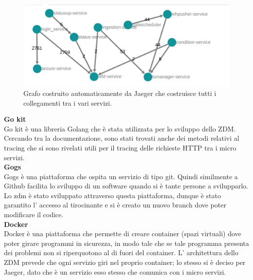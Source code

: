 \documentclass[a4paper,12pt,titlepage,italian,openany]{report}
\begin{document}
\begin{figure}[H]
    \includegraphics[scale=0.4]{grafo.jpg}
    \centering
    \caption{Grafo costruito automaticamente da Jaeger che costruisce tutti i collegamenti tra i vari servizi.}
\end{figure}

\textbf{Go kit}\\
Go kit\cite{go:2} è una libreria Golang che è stata utilizzata per lo sviluppo dello ZDM\cite{zdm:1}. Cercando tra la documentazione, sono stati trovati anche dei metodi relativi al tracing che si sono rivelati utili
per il tracing delle richieste HTTP tra i micro servizi. \\[12pt]

\textbf{Gogs}\\
Gogs\cite{gogs:1} è una piattaforma che ospita un servizio di tipo git. Quindi similmente a Github facilita lo sviluppo di un software quando si è tante persone a svilupparlo. Lo zdm è stato sviluppato attraverso questa piattaforma, dunque è stato garantito l' accesso al tirocinante e si è creato un nuovo branch dove poter modificare il codice. \\[12pt]

\textbf{Docker}\\
Docker\cite{docker:1} è una piattaforma che permette di creare container (spazi virtuali) dove poter girare programmi in sicurezza, in modo tale che se tale programma presenta dei problemi non si riperquotono al di fuori del container. L' architettura dello ZDM\cite{zdm:1} prevede che ogni servizio giri nel proprio container; lo stesso si è deciso per Jaeger, dato che è un servizio esso stesso che comunica con i micro servizi.\\[12pt]
\end{document}
